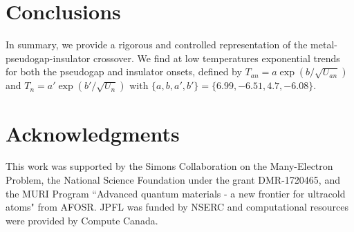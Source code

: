 \documentclass[twocolumn,notitlepage,prl,superscriptaddress,showpacs]{revtex4-1}
\begin{document}

\section{Conclusions}
In summary, we provide a rigorous and controlled representation of the metal-pseudogap-insulator crossover.  We find at low temperatures exponential trends for both the pseudogap and insulator onsets, defined by $T_{an}=a\exp(b/\sqrt{U_{an}})$ and $T_n=a'\exp(b'/\sqrt{U_n})$ with $\{a,b,a',b'\}=\{6.99,-6.51,4.7,-6.08\}$. 

\section{Acknowledgments}
This work was supported by the Simons Collaboration on the Many-Electron Problem, the National Science Foundation under the grant DMR-1720465, and the MURI Program ``Advanced quantum materials - a new frontier for ultracold atoms" from AFOSR. JPFL was funded by NSERC and computational resources were provided by Compute Canada.






\end{document}
